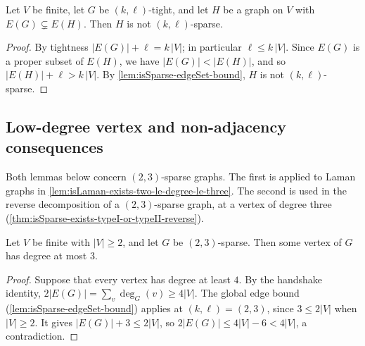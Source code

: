 \begin{lemma}
  \label{lem:isTight-not-isSparse-of-lt}
  \leanok
  Let $V$ be finite, let $G$ be $(k,\ell)$-tight, and let $H$ be a
  graph on $V$ with $E(G) \subsetneq E(H)$. Then $H$ is not
  $(k,\ell)$-sparse.
\end{lemma}
\begin{proof}
  \leanok
  By tightness $|E(G)| + \ell = k\,|V|$; in particular
  $\ell \le k\,|V|$. Since $E(G)$ is a proper subset of $E(H)$, we have
  $|E(G)| < |E(H)|$, and so $|E(H)| + \ell > k\,|V|$. By
  \cref{lem:isSparse-edgeSet-bound}, $H$ is not $(k,\ell)$-sparse.
\end{proof}

\subsection{Low-degree vertex and non-adjacency consequences}

Both lemmas below concern $(2,3)$-sparse graphs. The first is applied
to Laman graphs in \cref{lem:isLaman-exists-two-le-degree-le-three}.
The second is used in the reverse decomposition of a $(2,3)$-sparse
graph, at a vertex of degree three
(\cref{thm:isSparse-exists-typeI-or-typeII-reverse}).

\begin{lemma}
  \label{lem:isSparse-exists-degree-le-three}
  \leanok
  Let $V$ be finite with $|V| \ge 2$, and let $G$ be $(2,3)$-sparse.
  Then some vertex of $G$ has degree at most $3$.
\end{lemma}
\begin{proof}
  \leanok
  Suppose that every vertex has degree at least $4$. By the handshake
  identity, $2|E(G)| = \sum_v \deg_G(v) \ge 4|V|$. The global edge
  bound (\cref{lem:isSparse-edgeSet-bound}) applies at
  $(k, \ell) = (2, 3)$, since $3 \le 2|V|$ when $|V| \ge 2$. It gives
  $|E(G)| + 3 \le 2|V|$, so $2|E(G)| \le 4|V| - 6 < 4|V|$, a
  contradiction.
\end{proof}

